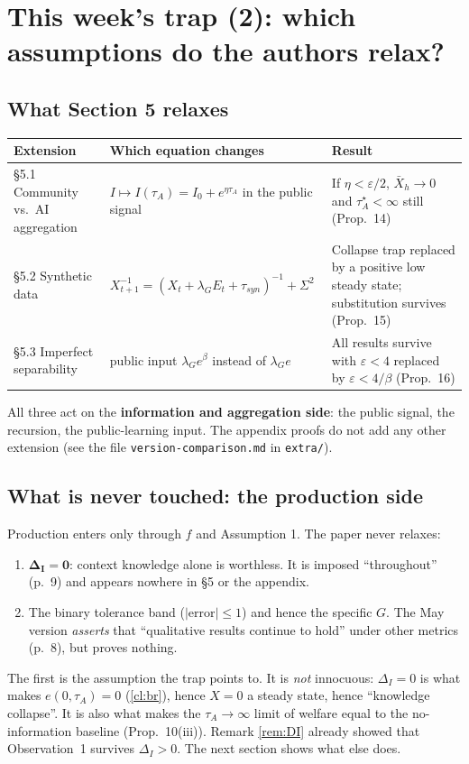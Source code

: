 \documentclass[11pt,a4paper]{article}
\theoremstyle{definition}
\theoremstyle{remark}
\newcommand{\tA}{\tau_A}
\newcommand{\lG}{\lambda_G}
\begin{document}
\section{This week's trap (2): which assumptions do the authors relax?}

\subsection{What Section 5 relaxes}
\begin{center}\small
\begin{tabular}{@{}p{3.3cm}p{5.2cm}p{5.5cm}@{}}
\toprule
Extension & Which equation changes & Result\\
\midrule
\S5.1 Community vs.\ AI aggregation & $I\mapsto I(\tA)=I_0+e^{\eta\tA}$ in the public signal & If $\eta<\varepsilon/2$, $\bar X_h\to0$ and $\tA^\star<\infty$ still (Prop.~14)\\
\S5.2 Synthetic data & $X_{t+1}^{-1}=(X_t+\lG E_t+\tau_{syn})^{-1}+\Sigma^2$ & Collapse trap replaced by a positive low steady state; substitution survives (Prop.~15)\\
\S5.3 Imperfect separability & public input $\lG e^\beta$ instead of $\lG e$ & All results survive with $\varepsilon<4$ replaced by $\varepsilon<4/\beta$ (Prop.~16)\\
\bottomrule
\end{tabular}
\end{center}
All three act on the \textbf{information and aggregation side}: the public signal, the recursion, the
public-learning input. The appendix proofs do not add any other extension (see the file
\texttt{version-comparison.md} in \texttt{extra/}).

\subsection{What is never touched: the production side}
Production enters only through $f$ and Assumption 1. The paper never relaxes:
\begin{enumerate}[nosep]
\item $\boldsymbol{\Delta_I=0}$: context knowledge alone is worthless. It is imposed ``throughout'' (p.~9) and
appears nowhere in \S5 or the appendix.
\item The binary tolerance band ($|\text{error}|\le1$) and hence the specific $G$. The May version
\emph{asserts} that ``qualitative results continue to hold'' under other metrics (p.~8), but proves nothing.
\end{enumerate}
\noindent The first is the assumption the trap points to. It is \emph{not} innocuous: $\Delta_I=0$ is what
makes $e(0,\tA)=0$ (\cref{cl:br}), hence $X=0$ a steady state, hence ``knowledge collapse''. It is also what
makes the $\tA\to\infty$ limit of welfare equal to the no-information baseline (Prop.~10(iii)). Remark
\ref{rem:DI} already showed that Observation~1 survives $\Delta_I>0$. The next section shows what else does.
\end{document}
